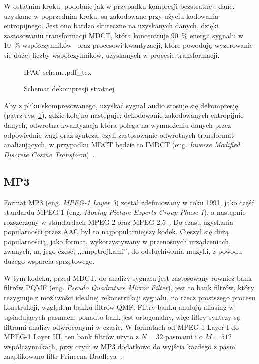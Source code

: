 \documentclass[pl,12pt]{aghdpl}
\let\Oldsubsection\subsection%
\renewcommand{\subsection}{\FloatBarrier\Oldsubsection}
\begin{document}
W ostatnim kroku, podobnie jak w przypadku kompresji bezstratnej, dane, uzyskane
w poprzednim kroku, są zakodowane przy użyciu kodowania entropijnego. Jest ono
bardzo skuteczne na uzyskanych danych, dzięki zastosowaniu transformacji MDCT,
która koncentruje \SI{90}{\percent} energii sygnału w \SI{10}{\percent}
współczynników~\cite{WangYaroslavskyVilermoVaananen2000} oraz procesowi
kwantyzacji, które powodują wyzerowanie się dużej liczby współczynników,
uzyskanych w procesie transformacji.

\begin{figure}[!tbh]
  \centering
  {IPAC-scheme.pdf_tex}
  \caption{Schemat dekompresji stratnej}
  \label{fig:IPAC_scheme}
\end{figure}

Aby z pliku skompresowanego, uzyskać sygnał audio stosuje się dekompresję (patrz
rys. \ref{fig:IPAC_scheme}), gdzie kolejno następuje: dekodowanie zakodowanych
entropijnie danych, odwrotna kwantyzacja która polega na wymnożeniu danych
przez odpowiednie wagi oraz synteza, czyli zastosowanie odwrotnych
transformat analizujących, w przypadku MDCT będzie to IMDCT (eng.
\textit{Inverse Modified Discrete Cosine Transform})~\cite{Brandenburg1999}.

\subsection{MP3}
Format MP3 (eng. \textit{MPEG-1 Layer 3}) został zdefiniowany w roku 1991, jako część
standardu MPEG-1 (eng. \textit{Moving Picture Experts Group Phase 1}), a
następnie rozszerzony w standardach MPEG-2 oraz
MPEG-2.5~\cite{Brandenburg1999}. Do czasu uzyskania popularności przez AAC był
to najpopularniejszy kodek. Cieszył się dużą popularnością, jako format,
wykorzystywany w przenośnych urządzeniach, zwanych, na jego cześć,
,,empetrójkami'', do odsłuchiwania muzyki, z powodu dużego wsparcia
sprzętowego.

W tym kodeku, przed MDCT, do analizy sygnału jest zastosowany również bank
filtrów PQMF (eng. \textit{Pseudo Quadrature Mirror Filter}), jest to bank
filtrów, który rezygnuje z możliwości idealnej rekonstrukcji sygnału, na rzecz
prostszego procesu konstrukcji, względem banku filtrów QMF. Filtry banku
anulują aliasing w sąsiadujących pasmach, ponadto bank jest ortogonalny, więc
filtry syntezy są filtrami analizy odwróconymi w czasie.  W formatach od MPEG-1
Layer I do MPEG-1 Layer III, ten bank filtrów użyto z $N = 32$ pasmami i o $M =
512$ współczynnikach, przy czym w MP3 dodatkowo do wyjścia każdego z pasm
zaaplikowano filtr Princena-Bradleya~\cite{Smith2011}.
\end{document}

